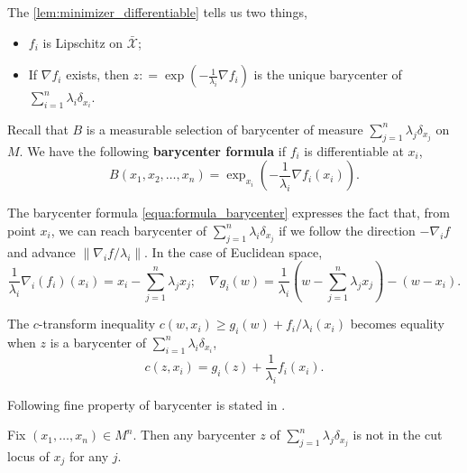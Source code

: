 The \cref{lem:minimizer_differentiable} tells us two things,
\begin{itemize}
	\item $f_i$ is Lipschitz on $\bar{ \mathcal{X} }$;
	\item If $ \nabla f_i $ exists, then $z: = \exp( - \frac{1}{\lambda_i}\nabla f_i)$ is the
	      unique barycenter of $\sum_{i=1}^n \lambda_i \delta_{x_i}$.
\end{itemize}
Recall that $B$ is a measurable selection of barycenter of
measure $\sum_{j=1}^{n} \lambda_j \delta_{x_j}$ on $M$.
We have the following \textbf{barycenter formula}
if $f_i$ is differentiable at $x_i$,
\begin{equation}
	\label{equa:formula_barycenter}
	B(x_1, x_2, \ldots, x_n) = \exp_{x_i} (- \frac{1}{\lambda_i} \nabla f_i(x_i)).
\end{equation}

The barycenter formula \cref{equa:formula_barycenter} expresses the fact that,
from point $x_i$,
we can reach barycenter of $\sum_{j=1}^n \lambda_i \delta_{x_j}$ if we follow the direction $-\nabla_i f$
and advance $\| \nabla_i f / \lambda_i \| $.
In the case of Euclidean space,
\[
	\frac{1}{\lambda_i} \nabla_i (f_i)(x_i) = x_i - \sum_{j=1}^n \lambda_j x_j;                              \quad
	\nabla g_i(w)  = \frac{1}{\lambda_i} (w - \sum_{j=1}^n \lambda_j x_j) -(w-x_i).
\]

The $c$-transform inequality
$ c(w, x_i) \geq g_i(w) + f_i / \lambda_i (x_i)$
becomes equality when $z$ is a barycenter of $\sum_{i=1}^{n} \lambda_i \delta_{x_i}$,
\begin{equation}
	\label{equa:g_i_conjugate}
	c(z, x_i) = g_i(z) + \frac{1}{\lambda_i} f_i(x_i).
\end{equation}

Following fine property of barycenter is stated in \cite[Lemma 3.1]{kim2015multi}.
\begin{lem}
	\label{lem:barycenter_out_of_cut_locus}
	Fix \( \left( x _ { 1 } , \ldots , x _ { n } \right) \in M^n\).
	Then any barycenter $z$ of $\sum_{j=1}^n \lambda_j \delta_{x_j}$
	is not in the cut locus of \( x _ { j } \) for any \( j . \)
\end{lem}

